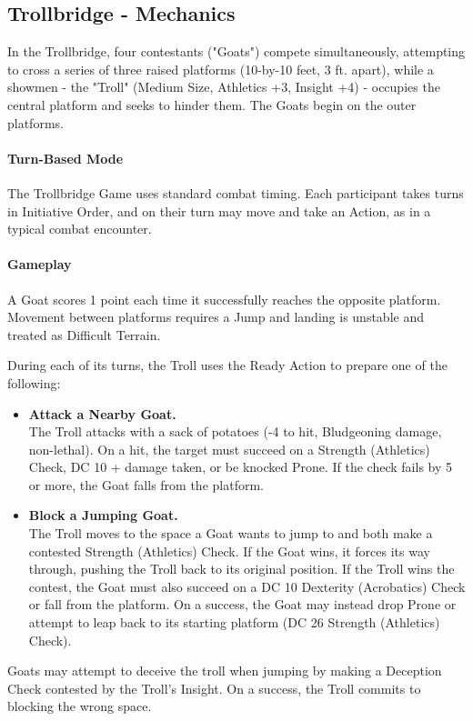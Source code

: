 \subsection*{Trollbridge - Mechanics}
{\entryfont In the Trollbridge, four contestants ("Goats") compete simultaneously, attempting to cross a series of three raised platforms (10-by-10 feet, 3 ft. apart), while a showmen - the "Troll" (Medium Size, Athletics +3, Insight +4) - occupies the central platform and seeks to hinder them. The Goats begin on the outer platforms.

\paragraph*{Turn-Based Mode} The Trollbridge Game uses standard combat timing. Each participant takes turns in Initiative Order, and on their turn may move and take an Action, as in a typical combat encounter.

\paragraph*{Gameplay} A Goat scores 1 point each time it successfully reaches the opposite platform. Movement between platforms requires a Jump and landing is unstable and treated as Difficult Terrain.

During each of its turns, the Troll uses the Ready Action to prepare one of the following:
\begin{itemize}
	\renewcommand\labelitemi{\textbf{\textbullet}}
	\item \textbf{Attack a Nearby Goat.}\\
	The Troll attacks with a sack of potatoes (-4 to hit,  Bludgeoning damage, non-lethal). On a hit, the target must succeed on a Strength (Athletics) Check, DC 10 + damage taken, or be knocked Prone. If the check fails by 5 or more, the Goat falls from the platform.
	\item \textbf{Block a Jumping Goat.}\\
	The Troll moves to the space a Goat wants to jump to and both make a contested Strength (Athletics) Check. If the Goat wins, it forces its way through, pushing the Troll back to its original position. If the Troll wins the contest, the Goat must also succeed on a DC 10 Dexterity (Acrobatics) Check or fall from the platform. On a success, the Goat may instead drop Prone or attempt to leap back to its starting platform (DC 26 Strength (Athletics) Check).
\end{itemize}
Goats may attempt to deceive the troll when jumping by making a Deception Check contested by the Troll's Insight. On a success, the Troll commits to blocking the wrong space.

}
